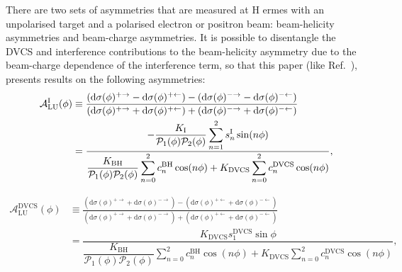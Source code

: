 There are two sets of asymmetries that are measured at H{\sc
ermes} with an unpolarised target and a polarised electron or positron beam:
beam-helicity asymmetries and beam-charge asymmetries. It is possible to
disentangle the DVCS and interference contributions to the beam-helicity
asymmetry due to the beam-charge dependence of the interference term, so that
this paper (like Ref.~\cite{Air09}), presents results on the following asymmetries:
\begin{align}
\hspace{0.5cm}\mathcal{A}^{\textrm{I}}_{\textrm{LU}}(\phi) &\equiv
\frac{(\textrm{d}\sigma(\phi)^{+\rightarrow} -
\textrm{d}\sigma(\phi)^{+\leftarrow}) -
(\textrm{d}\sigma(\phi)^{-\rightarrow}
- \textrm{d}\sigma(\phi)^{-\leftarrow})}{(\textrm{d}\sigma(\phi)^{+\rightarrow}
+
\textrm{d}\sigma(\phi)^{+\leftarrow}) +
(\textrm{d}\sigma(\phi)^{-\rightarrow}
+ \textrm{d}\sigma(\phi)^{-\leftarrow})}&  \nonumber \\
&=\dfrac{-\dfrac{K_{\textrm{I}}}{\mathcal{P}_{1}(\phi)\mathcal{P}_{2}(\phi)}
\displaystyle\sum_{n=1}^2
s_{n}^{\textrm{I}}\sin(n\phi)}{\dfrac{K_{\textrm{BH}}}{\mathcal{P}_{1}
(\phi)\mathcal{P}_{
2}(\phi)}
\displaystyle\sum_{n=0}^2
c_{n}^{\textrm{BH}}\cos(n\phi) + 
K_{\textrm{DVCS}}\displaystyle\sum_{n=0}^2 c_{n}^{\textrm{DVCS}}\cos(n\phi)},& 
\label{e:alui}
\end{align}

\begin{align}
\mathcal{A}^{\textrm{DVCS}}_{\textrm{LU}}(\phi) &\equiv
\frac{(\textrm{d}\sigma(\phi)^{+\rightarrow} +
\textrm{d}\sigma(\phi)^{-\rightarrow}) -
(\textrm{d}\sigma(\phi)^{+\leftarrow} + 
\textrm{d}\sigma(\phi)^{-\leftarrow})}
{(\textrm{d}\sigma(\phi)^{+\rightarrow} +
\textrm{d}\sigma(\phi)^{-\rightarrow}) +
(\textrm{d}\sigma(\phi)^{+\leftarrow}
+ \textrm{d}\sigma(\phi)^{-\leftarrow})}&  \nonumber \\
&=\dfrac{K_{\textrm{DVCS}}
s_{1}^{\textrm{DVCS}}\sin\phi}{\dfrac{K_{\textrm{BH}}}{\mathcal{P}_{1}
(\phi)\mathcal{P}_{2}(\phi)}
\displaystyle\sum_{n=0}^2
c_{n}^{\textrm{BH}}\cos(n\phi) + 
K_{\textrm{DVCS}}\displaystyle\sum_{n=0}^2 c_{n}^{\textrm{DVCS}}\cos(n\phi)},&
\label{e:aludvcs}
\end{align}

